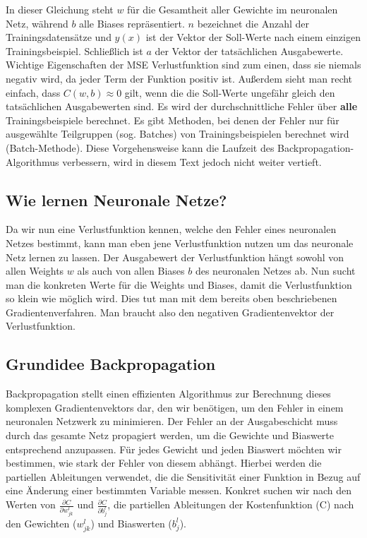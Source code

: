\noindent
In dieser Gleichung steht $w$ für die Gesamtheit aller Gewichte im neuronalen Netz, während $b$ alle Biases repräsentiert.
$n$ bezeichnet die Anzahl der Trainingsdatensätze und $y(x)$ ist der Vektor der Soll-Werte nach einem einzigen Trainingsbeispiel.
Schließlich ist $a$ der Vektor der tatsächlichen Ausgabewerte. 
\bigbreak\noindent
Wichtige Eigenschaften der MSE Verlustfunktion sind zum einen, dass sie niemals negativ wird, da jeder Term der Funktion positiv ist.
Außerdem sieht man recht einfach, dass $C(w, b) \approx 0$ gilt, wenn die die Soll-Werte ungefähr gleich den tatsächlichen Ausgabewerten sind.
\bigbreak\noindent
Es wird der durchschnittliche Fehler über \textbf{alle} Trainingsbeispiele berechnet. 
Es gibt Methoden, bei denen der Fehler nur für ausgewählte Teilgruppen (sog. Batches) von Trainingsbeispielen berechnet wird (Batch-Methode). 
Diese Vorgehensweise kann die Laufzeit des Backpropagation-Algorithmus verbessern, wird in diesem Text jedoch nicht weiter vertieft.

\subsection{Wie lernen Neuronale Netze?}\label{subsec:backpropagation:lernen_nn}
Da wir nun eine Verlustfunktion kennen, welche den Fehler eines neuronalen Netzes bestimmt, kann man eben jene
Verlustfunktion nutzen um das neuronale Netz lernen zu lassen. Der Ausgabewert der Verlustfunktion hängt sowohl von allen Weights $w$ 
als auch von allen Biases $b$ des neuronalen Netzes ab. Nun sucht man die konkreten Werte für die Weights und Biases, damit die 
Verlustfunktion so klein wie möglich wird. Dies tut man mit dem bereits oben beschriebenen Gradientenverfahren. Man braucht also den 
negativen Gradientenvektor der Verlustfunktion.

\subsection{Grundidee Backpropagation}\label{subsec:backpropagation:grundiee}
Backpropagation stellt einen effizienten Algorithmus zur Berechnung dieses komplexen Gradientenvektors dar, den wir benötigen, um den Fehler in einem neuronalen Netzwerk zu minimieren.
Der Fehler an der Ausgabeschicht muss durch das gesamte Netz propagiert werden, um die Gewichte und Biaswerte entsprechend anzupassen.
Für jedes Gewicht und jeden Biaswert möchten wir bestimmen, wie stark der Fehler von diesem abhängt. 
Hierbei werden die partiellen Ableitungen verwendet, die die Sensitivität einer Funktion in Bezug auf eine Änderung einer bestimmten Variable messen.
Konkret suchen wir nach den Werten von $\frac{\partial C}{\partial w_{jk}^{l}}$ und $\frac{\partial C}{\partial b_{j}^{l}}$, die partiellen Ableitungen der Kostenfunktion (C) nach den Gewichten ($w_{jk}^{l}$) und Biaswerten ($b_{j}^{l}$).

